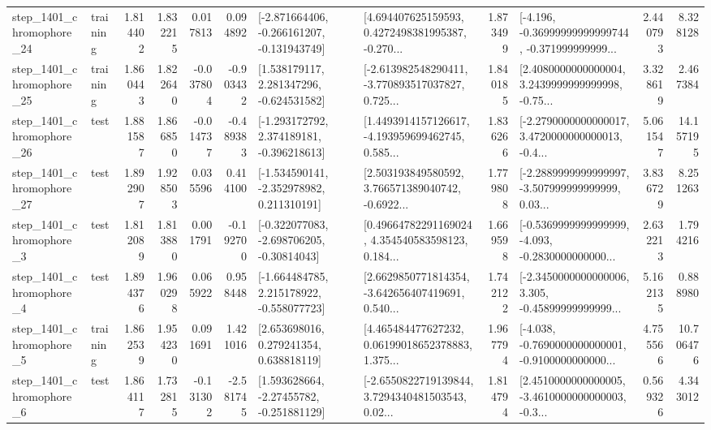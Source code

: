 \begin{tabular}{llrrrrllrlrr}
 step\_1401\_chromophore\_24 &  training &      1.814402 &    1.832215 &      0.017813 &  0.094892 &  [-2.871664406, -0.266161207, -0.131943749] &  [4.694407625159593, 0.4272498381995387, -0.270... &       1.873499 &  [-4.196, -0.36999999999999744, -0.371999999999... &            2.440793 &          8.328128 \\
 step\_1401\_chromophore\_25 &  training &      1.860443 &    1.822640 &     -0.037804 & -0.903432 &    [1.538179117, 2.281347296, -0.624531582] &  [-2.613982548290411, -3.770893517037827, 0.725... &       1.840185 &  [2.4080000000000004, 3.2439999999999998, -0.75... &            3.328619 &          2.467384 \\
 step\_1401\_chromophore\_26 &      test &      1.881587 &    1.866850 &     -0.014737 & -0.489383 &   [-1.293172792, 2.374189181, -0.396218613] &  [1.4493914157126617, -4.193959699462745, 0.585... &       1.836266 &  [-2.2790000000000017, 3.4720000000000013, -0.4... &            5.061547 &         14.157195 \\
 step\_1401\_chromophore\_27 &      test &      1.892907 &    1.928503 &      0.035596 &  0.414100 &   [-1.534590141, -2.352978982, 0.211310191] &  [2.503193849580592, 3.766571389040742, -0.6922... &       1.779808 &  [-2.2889999999999997, -3.507999999999999, 0.03... &            3.836729 &          8.251263 \\
  step\_1401\_chromophore\_3 &      test &      1.812089 &    1.813880 &      0.001791 & -0.192700 &   [-0.322077083, -2.698706205, -0.30814043] &  [0.49664782291169024, 4.354540583598123, 0.184... &       1.669598 &  [-0.5369999999999999, -4.093, -0.2830000000000... &            2.632213 &          1.794216 \\
  step\_1401\_chromophore\_4 &      test &      1.894376 &    1.960298 &      0.065922 &  0.958448 &   [-1.664484785, 2.215178922, -0.558077723] &  [2.6629850771814354, -3.642656407419691, 0.540... &       1.742122 &  [-2.3450000000000006, 3.305, -0.45899999999999... &            5.162135 &          0.888980 \\
  step\_1401\_chromophore\_5 &  training &      1.862539 &    1.954230 &      0.091691 &  1.421016 &     [2.653698016, 0.279241354, 0.638818119] &  [4.465484477627232, 0.06199018652378883, 1.375... &       1.967794 &  [-4.038, -0.7690000000000001, -0.9100000000000... &            4.755566 &         10.706476 \\
  step\_1401\_chromophore\_6 &      test &      1.864117 &    1.732815 &     -0.131302 & -2.581745 &    [1.593628664, -2.27455782, -0.251881129] &  [-2.6550822719139844, 3.7294340481503543, 0.02... &       1.814794 &  [2.4510000000000005, -3.4610000000000003, -0.3... &            0.569326 &          4.343012 \\

\end{tabular}
